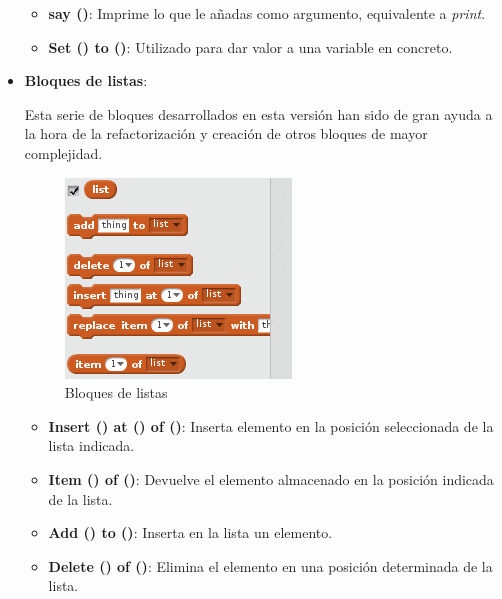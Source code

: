 \begin{itemize}
\begin{itemize}
\item \textbf{say ()}: Imprime lo que le añadas como argumento, equivalente a \textit{print}.
\item \textbf{Set () to ()}: Utilizado para dar valor a una variable en concreto.
\end{itemize}

\item \textbf{Bloques de listas}:

Esta serie de bloques desarrollados en esta versión han sido de gran ayuda a la hora de la refactorización y creación de otros bloques de mayor complejidad.

\begin{figure}[H]
     	\centering
     	\includegraphics[scale=0.60]{img/bloques-listas.png}
     	\caption{Bloques de listas}
  	\label{fig:listas}
\end{figure}

\begin{itemize}
\item \textbf{Insert () at () of ()}: Inserta elemento en la posición seleccionada de la lista indicada.
\item \textbf{Item () of ()}: Devuelve el elemento almacenado en la posición indicada de la lista.
\item \textbf{Add () to ()}: Inserta en la lista un elemento.
\item \textbf{Delete () of ()}: Elimina el elemento en una posición determinada de la lista.
\end{itemize}
\end{itemize}

